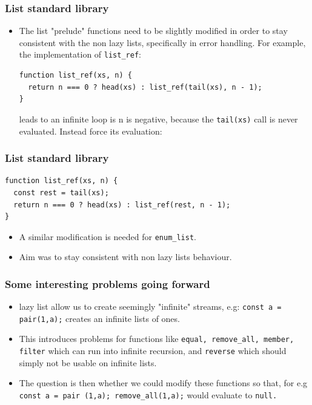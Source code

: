 \documentclass[12pt]{beamer}
\begin{document}
\begin{frame}[fragile]
\frametitle{List standard library}
\begin{itemize}
\item<1->The list "prelude" functions need to be slightly modified in order to stay consistent with the non lazy lists, specifically in error handling. For example, the implementation of \texttt{list\_ref}:
\begin{lstlisting}
function list_ref(xs, n) {
  return n === 0 ? head(xs) : list_ref(tail(xs), n - 1);
}
\end{lstlisting}
leads to an infinite loop is n is negative, because the \texttt{tail(xs)} call is never evaluated.
Instead force its evaluation:

\end{itemize}
\end{frame}

\begin{frame}[fragile]
\frametitle{List standard library}
\begin{lstlisting}
function list_ref(xs, n) {
  const rest = tail(xs);
  return n === 0 ? head(xs) : list_ref(rest, n - 1);
}
\end{lstlisting}
\begin{itemize}
    \item <1-> A similar modification is needed for \texttt{enum\_list}.
    \item <2-> Aim was to stay consistent with non lazy lists behaviour. 
\end{itemize}
\end{frame}

\begin{frame}
\frametitle{Some interesting problems going forward}
\begin{itemize}
    \item lazy list allow us to create seemingly "infinite" streams, e.g: \texttt{const a = pair(1,a);} creates an infinite lists of ones.
    \item <2-> This introduces problems for functions like \texttt{equal, remove\_all, member, filter} which can run into infinite recursion, and \texttt{reverse} which should simply not be usable on infinite lists.
    \item<3-> The question is then whether we could modify these functions so that, for e.g \break \texttt{const a = pair (1,a); remove\_all(1,a);} would evaluate to \texttt{null.}
\end{itemize}
\end{frame}
\end{document}
